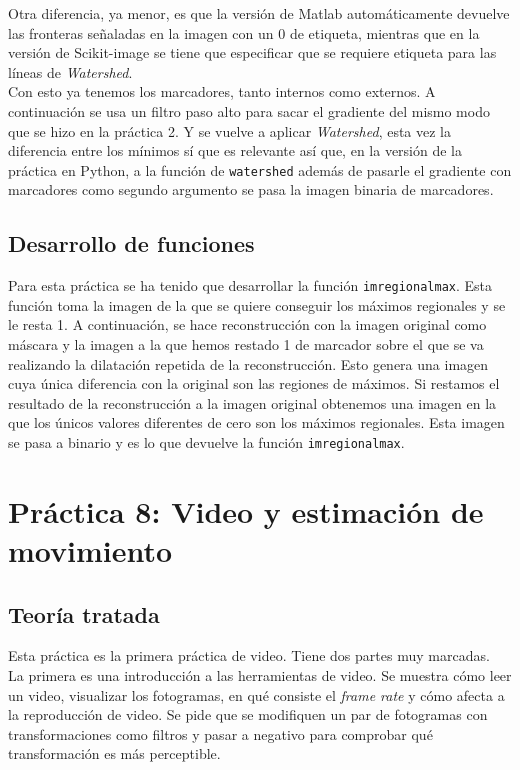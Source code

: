 \documentclass[a4paper,12pt]{report}
\begin{document}
 Otra diferencia, ya menor, es que la versión de Matlab automáticamente devuelve las fronteras señaladas en la imagen con un 0 de etiqueta, mientras que en la versión de Scikit-image se tiene que especificar que se requiere etiqueta para las líneas de \emph{Watershed}.\\

Con esto ya tenemos los marcadores, tanto internos como externos. A continuación se usa un filtro paso alto para sacar el gradiente del mismo modo que se hizo en la práctica 2. Y se vuelve a aplicar  \emph{Watershed}, esta vez la diferencia entre los mínimos sí que es relevante así que, en la versión de la práctica en Python, a la función de \texttt{watershed} además de pasarle el gradiente con marcadores como segundo argumento se pasa la imagen binaria de marcadores.\\


\subsection{Desarrollo de funciones}

Para esta práctica se ha tenido que desarrollar la función \texttt{imregionalmax}. Esta función toma la imagen de la que se quiere conseguir los máximos regionales y se le resta 1. A continuación, se hace reconstrucción con la imagen original como máscara y la imagen a la que hemos restado 1 de marcador sobre el que se va realizando la dilatación repetida de la reconstrucción. Esto genera una imagen cuya única diferencia con la original son las regiones de máximos. Si restamos el resultado de la reconstrucción a la imagen original obtenemos una imagen en la que los únicos valores diferentes de cero son los máximos regionales. Esta imagen se pasa a binario y es lo que devuelve la función \texttt{imregionalmax}.


\section{ Práctica 8: Video y estimación de movimiento}
\subsection{Teoría tratada}

Esta práctica es la primera práctica de video. Tiene dos partes muy marcadas.\\

La primera es una introducción a las herramientas de video. Se muestra cómo leer un video, visualizar los fotogramas, en qué consiste el \emph{frame rate} y cómo afecta a la reproducción de video. Se pide que se modifiquen un par de fotogramas con transformaciones como filtros y pasar a negativo para comprobar qué transformación es más perceptible.\\
\end{document}
